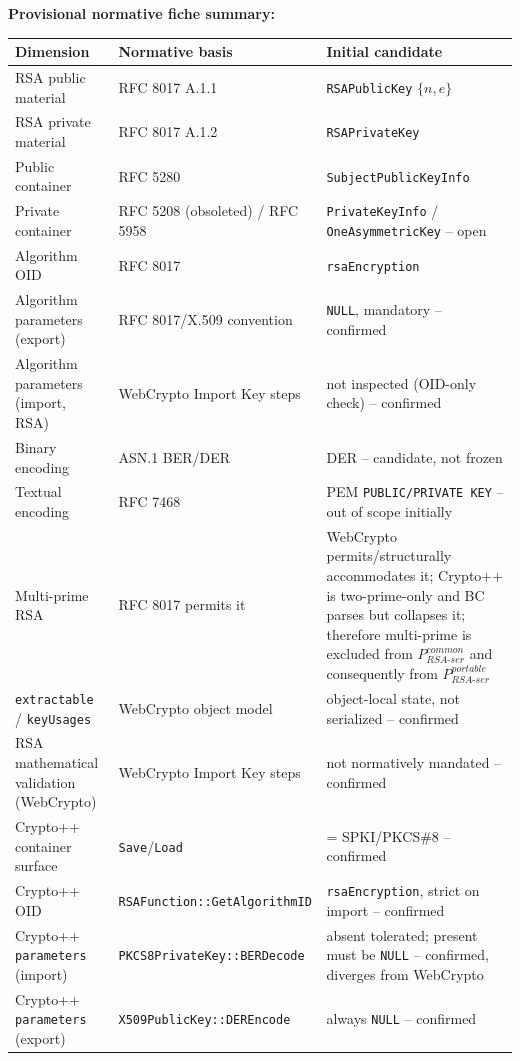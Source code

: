 \documentclass[11pt,a4paper]{article}
\begin{document}
\textbf{Provisional normative fiche summary:}
\begin{center}
\begin{tabularx}{\textwidth}{@{}l l >{\raggedright\arraybackslash}X@{}}
\toprule
Dimension & Normative basis & Initial candidate \\
\midrule
RSA public material & RFC 8017 A.1.1 & \texttt{RSAPublicKey} $\{n,e\}$ \\
RSA private material & RFC 8017 A.1.2 & \texttt{RSAPrivateKey} \\
Public container & RFC 5280 & \texttt{SubjectPublicKeyInfo} \\
Private container & RFC 5208 (obsoleted) / RFC 5958 & \texttt{PrivateKeyInfo} / \texttt{OneAsymmetricKey} -- open \\
Algorithm OID & RFC 8017 & \texttt{rsaEncryption} \\
Algorithm parameters (export) & RFC 8017/X.509 convention & \texttt{NULL}, mandatory -- confirmed \\
Algorithm parameters (import, RSA) & WebCrypto Import Key steps & not inspected (OID-only check) -- confirmed \\
Binary encoding & ASN.1 BER/DER & DER -- candidate, not frozen \\
Textual encoding & RFC 7468 & PEM \texttt{PUBLIC/PRIVATE KEY} -- out of scope initially \\
Multi-prime RSA & RFC 8017 permits it & WebCrypto permits/structurally accommodates it; Crypto++ is two-prime-only and BC parses but collapses it; therefore multi-prime is excluded from $P_{RSA\text{-}ser}^{common}$ and consequently from $P_{RSA\text{-}ser}^{portable}$ \\
\texttt{extractable} / \texttt{keyUsages} & WebCrypto object model & object-local state, not serialized -- confirmed \\
RSA mathematical validation (WebCrypto) & WebCrypto Import Key steps & not normatively mandated -- confirmed \\
Crypto++ container surface & \texttt{Save}/\texttt{Load} & = SPKI/PKCS\#8 -- confirmed \\
Crypto++ OID & \texttt{RSAFunction::GetAlgorithmID} & \texttt{rsaEncryption}, strict on import -- confirmed \\
Crypto++ \texttt{parameters} (import) & \texttt{PKCS8PrivateKey::BERDecode} & absent tolerated; present must be \texttt{NULL} -- confirmed, diverges from WebCrypto \\
Crypto++ \texttt{parameters} (export) & \texttt{X509PublicKey::DEREncode} & always \texttt{NULL} -- confirmed \\

\end{tabularx}
\end{center}
\end{document}
